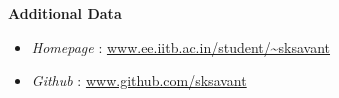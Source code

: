 \documentclass[a4paper,10pt]{article}
\newcommand{\resheading}[1]{{\small \colorbox{mygrey}{\begin{minipage}{0.975\textwidth}{\textbf{#1 \vphantom{p\^{E}}}}\end{minipage}}}}
\begin{document}
\begin{comment}
\resheading{\textbf{\large Technical Activities}}
\begin{itemize}
 \item Yahoo! HackU -2012: Built an android app and web interface, 'MapIt' which can be used to create customizable maps of localities with greater information\\[-0.7cm]
 \item Trackmania-2010 : Built a remote-controlled four-wheeled car (bot). \\[-0.7cm]
 	
 \item Line-follower competition-2011 :Built a line-following bot using IR sensors and Arduino.
\end{itemize}
\end{comment}
\begin{comment}
\resheading{\textbf{\large Extra Curricular Activities and Achievements}}
\begin{itemize}
  \item Participated in \textbf{Unnati}, the \textbf{NSS} (National Service Scheme) group of IIT Bombay.\\[-0.7cm]
	\begin{itemize}
	 \item Has been involved with the \textbf{GRA} (Group for Rural Activities) as part of curriculum in First year\\[-0.6cm]
	 \item Went to Village trips in Autumn 2010 and Spring 2011.\\[-0.6cm]
	 \item Continued as a voluntary member of the NSS Team in the subsequent year.\\[-0.6cm]
	  \end{itemize}
  \item Worked as `Organiser' in \textbf{Techfest-2011}, in the Lecture Series department. \\[-0.6cm]
  \item Participated in the Inter-hostel Hockey GC. 
\end{itemize}

\resheading{\textbf{\large Extra Courses currently taking (Autumn 2012)}}
  \begin{itemize}
  \item Data Structures and Algorithms
  \item Artificial Intelligence
  \item Foundations of VLSI CAD
\end{itemize}
\end{comment}
\resheading{\large{\textbf{Additional Data}}}
    \begin{itemize}
        \item \emph{Homepage} : \href{http://www.ee.iitb.ac.in/student/\~sksavant}{www.ee.iitb.ac.in/student/\textasciitilde{}sksavant} \\[-0.6cm]
        \item \emph{Github} : \href{http://www.github.com/sksavant}{www.github.com/sksavant}
    \end{itemize}
\end{document}
